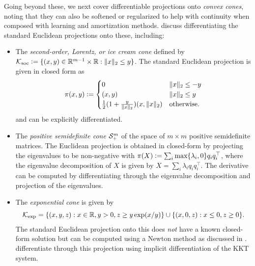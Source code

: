 \documentclass[twoside,11pt]{article}
\begin{document}
Going beyond these, we next cover differentiable projections onto
\emph{convex cones}, noting that they can also be softened or regularized
to help with continuity when composed with learning and
amortization methods.
\citet{ali2017semismooth,busseti2019solution} discuss
differentiating the standard Euclidean projections
onto these, including:
\begin{itemize}
\item
  \begin{minipage}[t]{0.65\textwidth}
  The \emph{second-order, Lorentz, or ice cream cone}
  defined by
  ${\mathcal{K}}_{\rm soc}\vcentcolon=\{(x,y)\in\mathbb{R}^{m-1}\times\mathbb{R} : \|x\|_2\leq y\}$.
  The standard Euclidean projection is given in closed form as
  \begin{equation}
    \pi(x, y) \vcentcolon=
    \begin{cases}
      0 & \|x\|_2 \leq -y \\
      (x,y) & \|x\|_2 \leq y \\
      \frac{1}{2} (1 + \frac{y}{\|x\|_2}) (x, \|x\|_2) & \textrm{otherwise}.
    \end{cases}
  \end{equation}
  and can be explicitly differentiated.
  \end{minipage}
  \hspace{8mm}
  \begin{minipage}[t]{0.2\textwidth}
  \vspace{-2mm}
  \end{minipage}
\item The \emph{positive semidefinite cone} ${\mathcal{S}}^m_+$ of the
  space of $m\times m$ positive semidefinite matrices.
  The Euclidean projection is obtained in closed-form
  by projecting the eigenvalues to be non-negative with
  $\pi(X)\vcentcolon=\sum_i\max\{\lambda_i, 0\}q_iq_i^\top$,
  where the eigenvalue decomposition of $X$ is given by
  $X=\sum_i\lambda_iq_iq_i^\top$.
  The derivative can be computed by differentiating
  through the eigenvalue decomposition and projection
  of the eigenvalues.
\item The \emph{exponential cone} is given by
  \begin{equation}
  {\mathcal{K}}_{\rm exp}=\{(x,y,z) : x\in\mathbb{R}, y>0, z\geq y\exp(x/y)\}\cup
  \{(x,0,z): x\leq0, z\geq 0\}.
  \label{eq:exp-cone}
  \end{equation}
  The standard Euclidean projection onto this does
  \emph{not} have a known closed-form solution
  but can be computed using a Newton method
  as discussed in
  \citet[\S6.3.4]{parikh2014proximal}.
  \citet{ali2017semismooth} differentiate through
  this projection using implicit differentiation
  of the KKT system.
\end{itemize}
\end{document}
